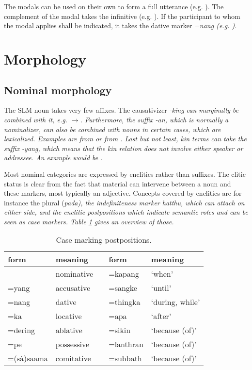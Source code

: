 The modals can be used on their own to form a full utterance (e.g. ). The complement of the modal takes the infinitive (e.g. ). If the participant to whom the modal applies shall be indicated, it takes the dative marker \em =nang \em (e.g. ).



\section{Morphology}
\subsection{Nominal morphology}\label{sec:nominalmorphology}
The SLM noun takes very few affixes. The causativizer \em -king \em can marginally be combined with it, e.g. $\to$. Furthermore, the suffix \em -an\em, which is normally a nominalizer, can also be combined with nouns in certain cases, which are lexicalized. Examples are  from  or  from . Last but not least, kin terms can take the suffix \em -yang\em, which means that the kin relation does not involve either speaker or addressee. An example would be .


Most nominal categories are expressed by enclitics rather than suffixes. The clitic status is clear from the fact that material can intervene between a noun and these markers, most typically an adjective. Concepts covered by enclitics are for instance the plural (\em pada\em), the indefiniteness marker \em hatthu\em, which can attach on either side, and the enclitic postpositions which indicate semantic roles and can be seen as case markers. Table  \ref{tab:casemarkers} gives an overview of those.

\begin{table}[p]
    \centering
 \begin{tabular}{lllll}
form & meaning && form & meaning\\
  \hline
\zero{}	   & nominative          && =kapang   & `when' \\
=yang	   & accusative          && =sangke   & `until' \\ 
=nang	   & dative              && =thingka  & `during, while' \\
=ka	   & locative            && =apa      & `after' \\ 
=dering	   & ablative 		 && =sikin    & `because (of)' \\
=pe	   & possessive	         && =lanthran & `because (of)' \\
=(sà)saama & comitative          && =subbath  & `because (of)' \\
 \end{tabular}
\caption{Case marking postpositions.}
\label{tab:casemarkers}
\end{table}

